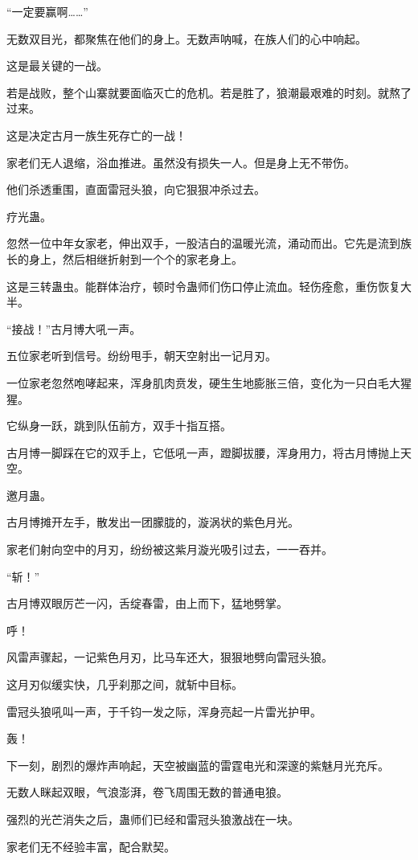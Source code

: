 \begin{this_body}
“一定要赢啊……”

无数双目光，都聚焦在他们的身上。无数声呐喊，在族人们的心中响起。

这是最关键的一战。

若是战败，整个山寨就要面临灭亡的危机。若是胜了，狼潮最艰难的时刻。就熬了过来。

这是决定古月一族生死存亡的一战！

家老们无人退缩，浴血推进。虽然没有损失一人。但是身上无不带伤。

他们杀透重围，直面雷冠头狼，向它狠狠冲杀过去。

疗光蛊。

忽然一位中年女家老，伸出双手，一股洁白的温暖光流，涌动而出。它先是流到族长的身上，然后相继折射到一个个的家老身上。

这是三转蛊虫。能群体治疗，顿时令蛊师们伤口停止流血。轻伤痊愈，重伤恢复大半。

“接战！”古月博大吼一声。

五位家老听到信号。纷纷甩手，朝天空射出一记月刃。

一位家老忽然咆哮起来，浑身肌肉贲发，硬生生地膨胀三倍，变化为一只白毛大猩猩。

它纵身一跃，跳到队伍前方，双手十指互搭。

古月博一脚踩在它的双手上，它低吼一声，蹬脚拔腰，浑身用力，将古月博抛上天空。

邀月蛊。

古月博摊开左手，散发出一团朦胧的，漩涡状的紫色月光。

家老们射向空中的月刃，纷纷被这紫月漩光吸引过去，一一吞并。

“斩！”

古月博双眼厉芒一闪，舌绽春雷，由上而下，猛地劈掌。

呼！

风雷声骤起，一记紫色月刃，比马车还大，狠狠地劈向雷冠头狼。

这月刃似缓实快，几乎刹那之间，就斩中目标。

雷冠头狼吼叫一声，于千钧一发之际，浑身亮起一片雷光护甲。

轰！

下一刻，剧烈的爆炸声响起，天空被幽蓝的雷霆电光和深邃的紫魅月光充斥。

无数人眯起双眼，气浪澎湃，卷飞周围无数的普通电狼。

强烈的光芒消失之后，蛊师们已经和雷冠头狼激战在一块。

家老们无不经验丰富，配合默契。


\end{this_body}
